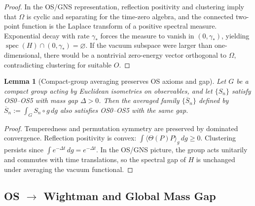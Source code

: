 \documentclass[11pt]{amsart}
\theoremstyle{plain}
\newtheorem{lemma}[theorem]{Lemma}
\theoremstyle{definition}
\theoremstyle{remark}
\begin{document}
\begin{proof}
In the OS/GNS representation, reflection positivity and clustering imply that $\Omega$ is cyclic and separating for the time-zero algebra, and the connected two-point function is the Laplace transform of a positive spectral measure. Exponential decay with rate $\gamma_*$ forces the measure to vanish in $(0,\gamma_*)$, yielding $\operatorname{spec}(H)\cap(0,\gamma_*)=\varnothing$. If the vacuum subspace were larger than one-dimensional, there would be a nontrivial zero-energy vector orthogonal to $\Omega$, contradicting clustering for suitable $O$.
\end{proof}
\begin{lemma}[Compact-group averaging preserves OS axioms and gap]\label{lem:group-avg}
Let $G$ be a compact group acting by Euclidean isometries on observables, and let $\{S_n\}$ satisfy OS0--OS5 with mass gap $\Delta>0$. Then the averaged family $\{\overline{S}_n\}$ defined by $\overline{S}_n:=\int_G S_n\circ g\,dg$ also satisfies OS0--OS5 with the same gap.
\end{lemma}
\begin{proof}
Temperedness and permutation symmetry are preserved by dominated convergence. Reflection positivity is convex: $\int \langle\Theta(P)P\rangle_g\,dg\ge 0$. Clustering persists since $\int e^{-\Delta t}\,dg=e^{-\Delta t}$. In the OS/GNS picture, the group acts unitarily and commutes with time translations, so the spectral gap of $H$ is unchanged under averaging the vacuum functional.
\end{proof}
\subsection{OS $\to$ Wightman and Global Mass Gap}
\end{document}
